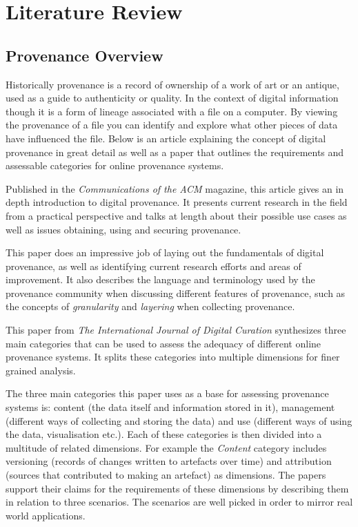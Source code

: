 \chapter{Literature Review}

\section{Provenance Overview}
\label{sec:provenance_overview}

Historically provenance is a record of ownership of a work of art or an antique, used as a guide to authenticity or quality. In the context of digital information though it is a form of lineage associated with a file on a computer. By viewing the provenance of a file you can identify and explore what other pieces of data have influenced the file. Below is an article explaining the concept of digital provenance in great detail as well as a paper that outlines the requirements and assessable categories for online provenance systems.

\label{sub:a_primer_on_provenance}

Published in the \textit{Communications of the ACM} magazine, this article gives an in depth introduction to digital provenance. It presents current research in the field from a practical perspective and talks at length about their possible use cases as well as issues obtaining, using and securing provenance.

This paper does an impressive job of laying out the fundamentals of digital provenance, as well as identifying current research efforts and areas of improvement. It also describes the language and terminology used by the provenance community when discussing different features of provenance, such as the concepts of \textit{granularity} and \textit{layering} when collecting provenance.

\label{sub:requirements_for_provenance_on_the_web}

This paper from \textit{The International Journal of Digital Curation} synthesizes three main categories that can be used to assess the adequacy of different online provenance systems. It splits these categories into multiple dimensions for finer grained analysis.

The three main categories this paper uses as a base for assessing provenance systems is: content (the data itself and information stored in it), management (different ways of collecting and storing the data) and use (different ways of using the data, visualisation etc.). Each of these categories is then divided into a multitude of related dimensions. For example the \textit{Content} category includes versioning (records of changes written to artefacts over time) and attribution (sources that contributed to making an artefact) as dimensions. The papers support their claims for the requirements of these dimensions by describing them in relation to three scenarios. The scenarios are well picked in order to mirror real world applications.

